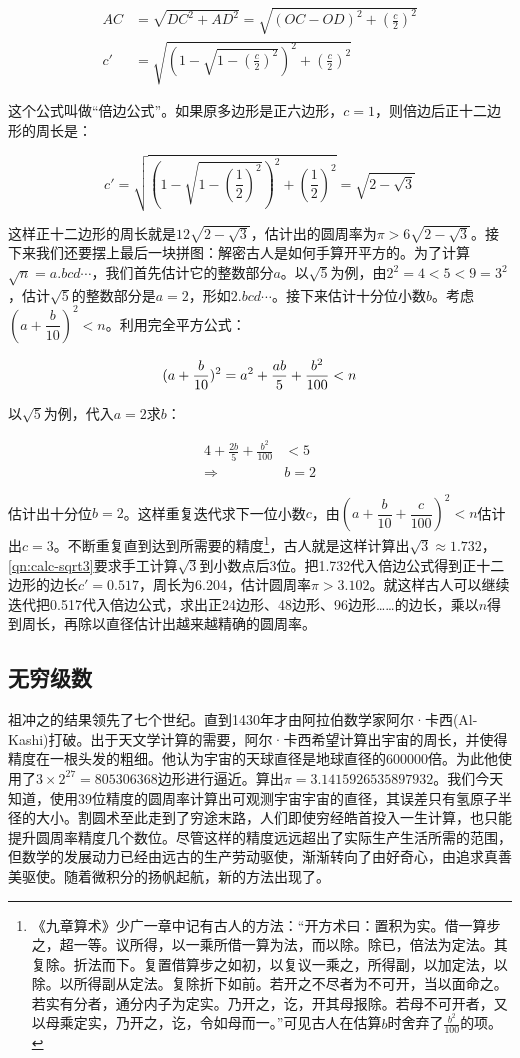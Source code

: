 \documentclass[b5paper]{ctexart}
\begin{document}
\begin{align}
AC &= \sqrt{DC^2 + AD^2} = \sqrt{(OC - OD)^2 + (\frac{c}{2})^2}  \\
c' &= \sqrt{(1 - \sqrt{1 - (\frac{c}{2})^2})^2 + (\frac{c}{2})^2}
\label{eq:double-edges}
\end{align}

这个公式叫做“倍边公式”。如果原多边形是正六边形，$c = 1$，则倍边后正十二边形的周长是：

\[
c' = \sqrt{(1 - \sqrt{1 - (\frac{1}{2})^2})^2 + (\frac{1}{2})^2} = \sqrt{2 - \sqrt{3}}
\]

这样正十二边形的周长就是$12\sqrt{2 - \sqrt{3}}$，估计出的圆周率为$\pi > 6\sqrt{2 - \sqrt{3}}$。接下来我们还要摆上最后一块拼图：解密古人是如何手算开平方的。为了计算$\sqrt{n} = a.bcd\dotsm$，我们首先估计它的整数部分$a$。以$\sqrt{5}$为例，由$2^2 = 4 < 5 < 9 = 3^2$，估计$\sqrt{5}$的整数部分是$a = 2$，形如$2.bcd\dotsm$。接下来估计十分位小数$b$。考虑$(a + \dfrac{b}{10})^2 < n$。利用完全平方公式：

\[
(a + \frac{b}{10})^2 = a^2 + \frac{ab}{5} + \frac{b^2}{100}  < n \\
\]

以$\sqrt{5}$为例，代入$a = 2$求$b$：

\begin{align*}
4 + \frac{2b}{5} + \frac{b^2}{100} &< 5 \\
 \Rightarrow & b = 2
\end{align*}

估计出十分位$b = 2$。这样重复迭代求下一位小数$c$，由$(a + \dfrac{b}{10} + \dfrac{c}{100})^2 < n$估计出$c = 3$。不断重复直到达到所需要的精度\footnote{《九章算术》少广一章中记有古人的方法：“开方术曰：置积为实。借一算步之，超一等。议所得，以一乘所借一算为法，而以除。除已，倍法为定法。其复除。折法而下。复置借算步之如初，以复议一乘之，所得副，以加定法，以除。以所得副从定法。复除折下如前。若开之不尽者为不可开，当以面命之。若实有分者，通分内子为定实。乃开之，讫，开其母报除。若母不可开者，又以母乘定实，乃开之，讫，令如母而一。”可见古人在估算$b$时舍弃了$\frac{b^2}{100}$的项。}，古人就是这样计算出$\sqrt{3} \approx 1.732$，\cref{qn:calc-sqrt3}要求手工计算$\sqrt{3}$到小数点后3位。把1.732代入倍边公式得到正十二边形的边长$c' = 0.517$，周长为6.204，估计圆周率$\pi > 3.102$。就这样古人可以继续迭代把0.517代入倍边公式，求出正24边形、48边形、96边形……的边长，乘以$n$得到周长，再除以直径估计出越来越精确的圆周率。

\subsection{无穷级数}
祖冲之的结果领先了七个世纪。直到1430年才由阿拉伯数学家阿尔·卡西(Al-Kashi)打破。出于天文学计算的需要，阿尔·卡西希望计算出宇宙的周长，并使得精度在一根头发的粗细。他认为宇宙的天球直径是地球直径的600000倍。为此他使用了$3 \times 2^{27} = 805306368$边形进行逼近。算出$\pi = 3.1415926535897932$。我们今天知道，使用39位精度的圆周率计算出可观测宇宙宇宙的直径，其误差只有氢原子半径的大小。割圆术至此走到了穷途末路，人们即使穷经皓首投入一生计算，也只能提升圆周率精度几个数位。尽管这样的精度远远超出了实际生产生活所需的范围，但数学的发展动力已经由远古的生产劳动驱使，渐渐转向了由好奇心，由追求真善美驱使。随着微积分的扬帆起航，新的方法出现了。
\end{document}

